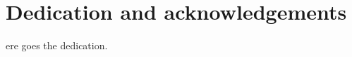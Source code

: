 
\chapter*{Dedication and acknowledgements}
\begin{SingleSpace}
ere goes the dedication.
\end{SingleSpace}
\clearpage